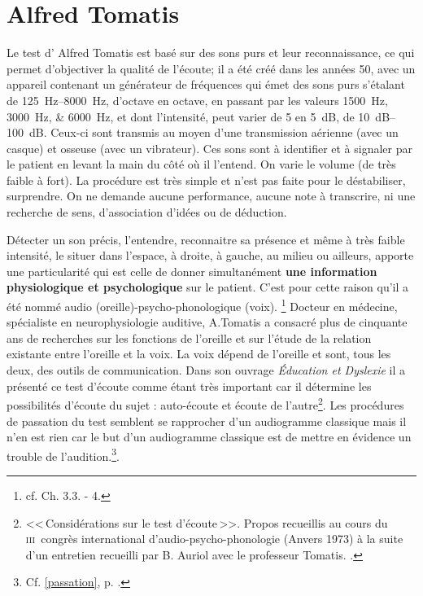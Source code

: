 \chapter{Alfred Tomatis}
 
 Le test d' Alfred Tomatis est basé sur des sons purs et leur
 reconnaissance, ce qui permet d'objectiver la qualité de l'écoute; il a été créé dans les années 50, avec un
  appareil contenant un générateur de fréquences qui émet des sons
  purs s'étalant de \SIrange{125}{8000}{\Hz}, d'octave en octave, en passant par les valeurs
\SIlist{1500;3000;6000}{\Hz}, et dont l'intensité, peut varier de 5 en \SI{5}{\dB}, de \SIrange{10}{100}{\dB}. 
Ceux-ci sont transmis au moyen d'une
  transmission aérienne (avec un casque) et osseuse (avec un vibrateur). Ces sons sont à identifier et à
  signaler par le patient en levant la main du côté où il l'entend. On
  varie le volume (de très faible à fort). La procédure est très
  simple et n'est pas faite pour le déstabiliser, surprendre. On ne 
  demande aucune performance, aucune note à transcrire, ni une 
  recherche de sens, d'association d'idées ou de
  déduction.
 
 Détecter un son précis, l'entendre, reconnaitre sa présence et même à très
 faible intensité, le situer dans l'espace, à droite, à gauche, au
 milieu ou ailleurs,  apporte une particularité qui est celle de  donner simultanément  \textbf{une information
   physiologique et psychologique} sur le patient.
 C'est pour cette raison qu'il a été nommé
 audio (oreille)-psycho-phonologique (voix). \footnote{cf. Ch. 3.3. - 4.}
  Docteur en médecine, spécialiste en neurophysiologie auditive,
  A.Tomatis a consacré plus de cinquante ans de recherches sur les
  fonctions de l'oreille et  sur l'étude de la relation existante entre
  l'oreille et la voix.  La voix dépend de l'oreille et sont, tous les
  deux, des outils de communication.
  Dans son ouvrage \emph{Éducation et
    Dyslexie}\autocite{tomatis:education} il
  a présenté ce test d'écoute comme étant très important car il détermine les
  possibilités d'écoute du sujet : auto-écoute et écoute de
  l'autre\footnote{<<\,Considérations sur le test d'écoute\,>>. Propos
  	recueillis au cours du \textsc{iii}\ieme\ congrès international
  	d'audio-psycho-phonologie (Anvers 1973) à la suite d'un entretien recueilli par B. Auriol
  	avec le professeur Tomatis. \autocite{auriol_stress}.}. 
   Les procédures de passation du test semblent
  se rapprocher d'un audiogramme classique mais il n'en est rien car
  le but d'un audiogramme classique  est de mettre en évidence un
  trouble de l'audition.\footnote{Cf. \ref{passation}, p. 
    \pageref{passation}.}.
  

